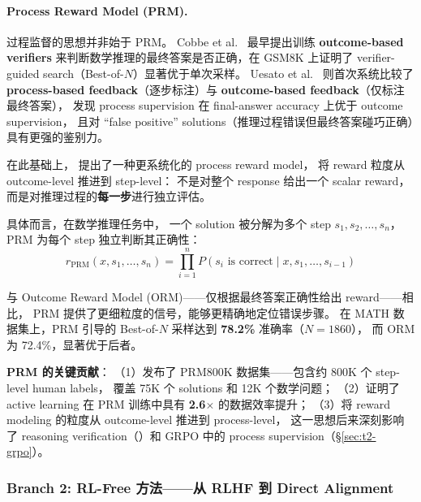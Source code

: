 \paragraph{Process Reward Model (PRM).}
过程监督的思想并非始于 PRM。
Cobbe et al.\ \cite{cobbe2021gsm8k} 最早提出训练 \textbf{outcome-based verifiers}
来判断数学推理的最终答案是否正确，在 GSM8K 上证明了
verifier-guided search（Best-of-$N$）显著优于单次采样。
Uesato et al.\ \cite{uesato2022process} 则首次系统比较了
\textbf{process-based feedback}（逐步标注）与 \textbf{outcome-based feedback}（仅标注最终答案），
发现 process supervision 在 final-answer accuracy 上优于 outcome supervision，
且对 ``false positive'' solutions（推理过程错误但最终答案碰巧正确）具有更强的鉴别力。

在此基础上， 提出了一种更系统化的 process reward model，
将 reward 粒度从 outcome-level 推进到 step-level：
不是对整个 response 给出一个 scalar reward，
而是对推理过程的\textbf{每一步}进行独立评估。

具体而言，在数学推理任务中，
一个 solution 被分解为多个 step $s_1, s_2, \ldots, s_n$，
PRM 为每个 step 独立判断其正确性：
\begin{equation}
\label{eq:pref:prm}
r_{\text{PRM}}(x, s_1, \ldots, s_n) = \prod_{i=1}^{n} P(s_i \text{ is correct} \mid x, s_1, \ldots, s_{i-1})
\end{equation}

与 Outcome Reward Model (ORM)——仅根据最终答案正确性给出 reward——相比，
PRM 提供了更细粒度的信号，能够更精确地定位错误步骤。
在 MATH 数据集上，PRM 引导的 Best-of-$N$ 采样达到 \textbf{78.2\%} 准确率（$N=1860$），
而 ORM 为 72.4\%，显著优于后者。

\begin{solutionbox}
\textbf{PRM 的关键贡献}：
（1）发布了 PRM800K 数据集——包含约 800K 个 step-level human labels，
覆盖 75K 个 solutions 和 12K 个数学问题；
（2）证明了 active learning 在 PRM 训练中具有 \textbf{2.6$\times$} 的数据效率提升；
（3）将 reward modeling 的粒度从 outcome-level 推进到 process-level，
这一思想后来深刻影响了 reasoning verification（）和
GRPO 中的 process supervision（\S\ref{sec:t2-grpo}）。
\end{solutionbox}

\subsubsection{Branch 2: RL-Free 方法——从 RLHF 到 Direct Alignment}
\label{sec:t2-rlfree}

